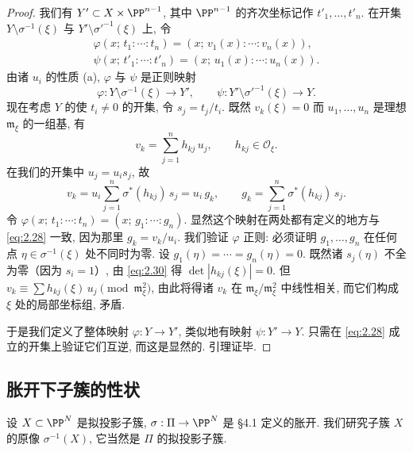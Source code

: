 \begin{proof}
	我们有 $Y' \subset X \times \PP^{n-1}$, 其中 $\PP^{n-1}$ 的齐次坐标记作 $t'_1, \ldots, t'_n$. 在开集 $Y \setminus \sigma^{-1}(\xi)$ 与 $Y' \setminus \sigma'^{-1}(\xi)$ 上, 令
	\begin{equation}
		\label{eq:2.28}
		\begin{split}
			\varphi(x;\, t_1 : \cdots : t_n) = (x;\, v_1(x) : \cdots : v_n(x)), \\
			\psi(x;\, t'_1 : \cdots : t'_n) = (x;\, u_1(x) : \cdots : u_n(x)).
		\end{split}
	\end{equation}
	由诸 $u_i$ 的性质 (a), $\varphi$ 与 $\psi$ 是正则映射
	\[
		\varphi: Y \setminus \sigma^{-1}(\xi) \to Y', \qquad \psi: Y' \setminus \sigma'^{-1}(\xi) \to Y.
	\]
	现在考虑 $Y$ 的使 $t_i \ne 0$ 的开集, 令 $s_j = t_j/t_i$. 既然 $v_k(\xi) = 0$ 而 $u_1, \ldots, u_n$ 是理想 $\mathfrak m_\xi$ 的一组基, 有
	\begin{equation}
		\label{eq:2.29}
		v_k = \sum_{j=1}^{n} h_{kj}\, u_j, \qquad h_{kj} \in \mathcal O_\xi.
	\end{equation}
	在我们的开集中 $u_j = u_i s_j$, 故
	\begin{equation}
		\label{eq:2.30}
		v_k = u_i \sum_{j=1}^{n} \sigma^*(h_{kj})\, s_j = u_i\, g_k, \qquad g_k = \sum_{j=1}^{n} \sigma^*(h_{kj})\, s_j.
	\end{equation}
	令 $\varphi(x;\, t_1 : \cdots : t_n) = (x;\, g_1 : \cdots : g_n)$. 显然这个映射在两处都有定义的地方与 \eqref{eq:2.28} 一致, 因为那里 $g_k = v_k/u_i$. 我们验证 $\varphi$ 正则: 必须证明 $g_1, \ldots, g_n$ 在任何点 $\eta \in \sigma^{-1}(\xi)$ 处不同时为零. 设 $g_1(\eta) = \cdots = g_n(\eta) = 0$. 既然诸 $s_j(\eta)$ 不全为零（因为 $s_i = 1$）, 由 \eqref{eq:2.30} 得 $\det|h_{kj}(\xi)| = 0$. 但 $v_k \equiv \sum h_{kj}(\xi)\, u_j \pmod{\mathfrak m_\xi^2}$, 由此将得诸 $v_k$ 在 $\mathfrak m_\xi/\mathfrak m_\xi^2$ 中线性相关, 而它们构成 $\xi$ 处的局部坐标组, 矛盾.

	于是我们定义了整体映射 $\varphi: Y \to Y'$, 类似地有映射 $\psi: Y' \to Y$. 只需在 \eqref{eq:2.28} 成立的开集上验证它们互逆, 而这是显然的. 引理证毕.
\end{proof}

\subsection{胀开下子簇的性状}

设 $X \subset \PP^N$ 是拟投影子簇, $\sigma: \Pi \to \PP^N$ 是 §4.1 定义的胀开. 我们研究子簇 $X$ 的原像 $\sigma^{-1}(X)$, 它当然是 $\Pi$ 的拟投影子簇.

